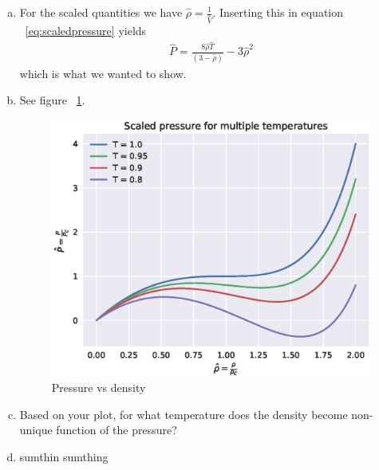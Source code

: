 \documentclass[aps,reprint]{revtex4-1}
\begin{document}
\begin{enumerate}[(a)]
  \item For the scaled quantities we have $\hat{\rho} = \frac{1}{\hat{V}}$.
  Inserting this in equation ~\ref{eq:scaledpressure} yields
  \begin{align}
    \hat{P} = \frac{8\hat{\rho}\hat{T}}{(3 - \hat{\rho})} - 3\hat{\rho}^2
  \end{align}
  which is what we wanted to show.

  \item See figure ~\ref{fig:pressure_density}.
  \begin{figure}[H]
    \centering
    \includegraphics[width=\columnwidth]{figures/pressure_d.eps}
    \caption{Pressure vs density}
    \label{fig:pressure_density}
  \end{figure}

  \item Based on your plot, for what temperature does the density become
  non-unique function of the pressure?

  \item sumthin sumthing
\end{enumerate}
\end{document}
